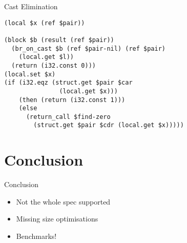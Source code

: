 \documentclass{beamer}
\begin{document}
\begin{frame}[fragile]{Cast Elimination}
\small
\begin{verbatim}
(local $x (ref $pair))

(block $b (result (ref $pair))
  (br_on_cast $b (ref $pair-nil) (ref $pair)
    (local.get $l))
  (return (i32.const 0)))
(local.set $x)
(if (i32.eqz (struct.get $pair $car
               (local.get $x)))
    (then (return (i32.const 1)))
    (else
      (return_call $find-zero
        (struct.get $pair $cdr (local.get $x)))))
\end{verbatim}
\end{frame}

\section{Conclusion}
\begin{frame}{Conclusion}
  \begin{itemize}
    \item Not the whole spec supported
    \item Missing size optimisations
    \item Benchmarks!
  \end{itemize}
\end{frame}
\end{document}
